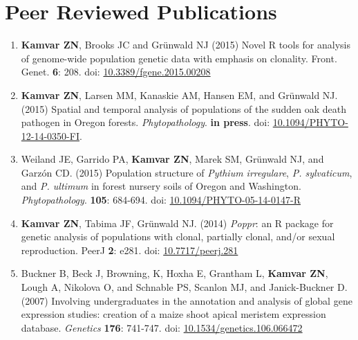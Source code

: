 
\section{Peer Reviewed Publications}

\begin{enumerate}[leftmargin = 14pt]
	\item \textbf{Kamvar ZN}, Brooks JC and Gr\"unwald NJ (2015) Novel R tools for
	analysis of genome-wide population genetic data with emphasis on clonality.
	Front. Genet. \textbf{6}: 208. doi: 
	\href{http://dx.doi.org/10.3389/fgene.2015.00208}{10.3389/fgene.2015.00208}

	\vspace{6pt}

	\item \textbf{Kamvar ZN}, Larsen MM, Kanaskie AM, Hansen EM, and Gr\"unwald
	NJ. (2015) Spatial and temporal analysis of populations of the sudden oak
	death pathogen in Oregon forests. \textit{Phytopathology}. \textbf{in
	press}. doi: \href{http://dx.odi.org/10.1094/PHYTO-12-14-0350-FI}{10.1094/PHYTO-12-14-0350-FI}.
	
	\vspace{6pt}

	\item Weiland JE, Garrido PA, \textbf{Kamvar ZN}, Marek SM, Gr\"unwald NJ, and
	Garz\'on CD. (2015) Population structure of \textit{Pythium irregulare}, \textit{P.
	sylvaticum}, and \textit{P. ultimum} in forest nursery soils of Oregon and
	Washington. \textit{Phytopathology}. \textbf{105}: 684-694. doi: 
	\href{http://dx.doi.org/10.1094/PHYTO-05-14-0147-R}{10.1094/PHYTO-05-14-0147-R}

	\vspace{6pt}

    \item \textbf{Kamvar ZN}, Tabima JF, Gr\"unwald NJ. (2014) \textit{Poppr}: an
	R package for genetic analysis of populations with clonal, partially clonal,
	and/or sexual reproduction. PeerJ \textbf{2}: e281.
	doi: \href{http://dx.doi.org/10.7717/peerj.281}{10.7717/peerj.281}
	
	\vspace{6pt}

	\item Buckner B, Beck J, Browning, K, Hoxha E, Grantham L, \textbf{Kamvar
	ZN}, Lough A, Nikolova O, and Schnable PS, Scanlon MJ, and Janick-Buckner D.
	(2007) Involving undergraduates in the annotation and analysis of global
	gene expression studies: creation of a maize shoot apical meristem
	expression database. \textit{Genetics}
	\textbf{176}: 741-747. doi: 
	\href{http://dx.doi.org/10.1534/genetics.106.066472}{10.1534/genetics.106.066472}

\end{enumerate}



